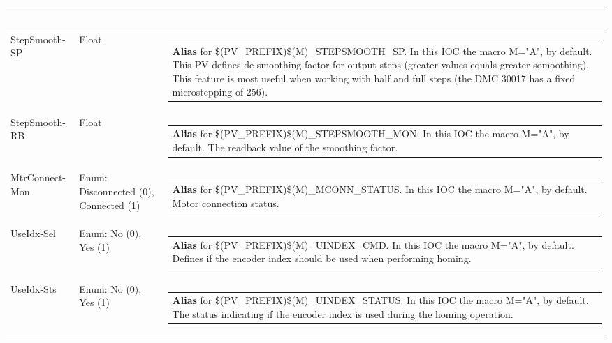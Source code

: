 \documentclass[openany]{article}
\begin{document}
\begin{longtable}{| m{4.5cm} m{2.5cm}  m{8.5cm} |}
\begin{tabular}{@{}m{6cm}@{}}
            \end{tabular} \hypertarget{pv:step-smooth}{}\\ \hline
        StepSmooth-SP & Float & \begin{tabular}{@{}m{6cm}@{}}
                \textbf{\color{blue} Alias} for \$(PV\_PREFIX)\$(M)\_STEPSMOOTH\_SP. In this IOC the macro M="A", by default. This PV defines de smoothing factor for output steps (greater values equals greater somoothing). This feature is most useful when working with half and full steps (the DMC 30017 has a fixed microstepping of 256).
            \end{tabular} \hypertarget{}{}\\ \hline
        StepSmooth-RB & Float & \begin{tabular}{@{}m{6cm}@{}}
                \textbf{\color{blue} Alias} for \$(PV\_PREFIX)\$(M)\_STEPSMOOTH\_MON. In this IOC the macro M="A", by default. The readback value of the smoothing factor.
            \end{tabular} \hypertarget{pv:mtr-connect-mon}{}\\ \hline
        MtrConnect-Mon & Enum: Disconnected (0), Connected (1) & \begin{tabular}{@{}m{6cm}@{}}
                \textbf{\color{blue} Alias} for \$(PV\_PREFIX)\$(M)\_MCONN\_STATUS. In this IOC the macro M="A", by default. Motor connection status.
            \end{tabular} \hypertarget{pv:use-idx}{}\\ \hline
        UseIdx-Sel & Enum: No (0), Yes (1) & \begin{tabular}{@{}m{6cm}@{}}
                \textbf{\color{blue} Alias} for \$(PV\_PREFIX)\$(M)\_UINDEX\_CMD. In this IOC the macro M="A", by default. Defines if the encoder index should be used when performing homing.
            \end{tabular} \hypertarget{}{}\\ \hline
        UseIdx-Sts & Enum: No (0), Yes (1) & \begin{tabular}{@{}m{6cm}@{}}
                \textbf{\color{blue} Alias} for \$(PV\_PREFIX)\$(M)\_UINDEX\_STATUS. In this IOC the macro M="A", by default. The status indicating if the encoder index is used during the homing operation.
            \end{tabular} \hypertarget{pv:use-sw}{}\\ \hline

\end{longtable}
\end{document}
